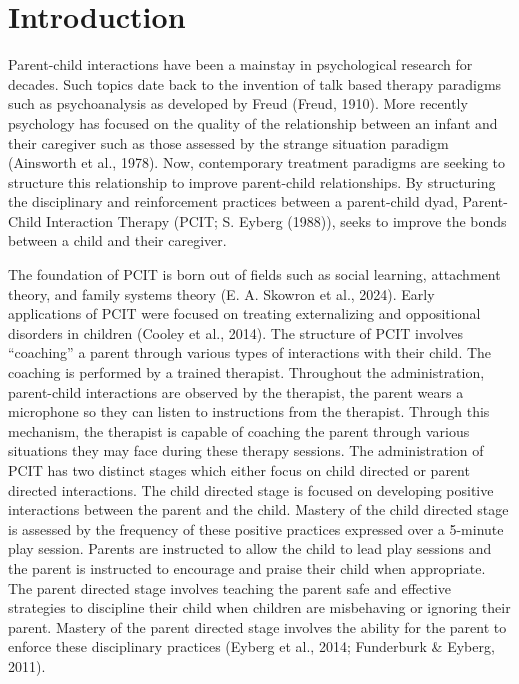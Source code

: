 \documentclass[12pt]{./styles/outhesis}
\begin{document}
\section{Introduction}
Parent-child interactions have been a mainstay in psychological research
for decades. Such topics date back to the invention of talk based
therapy paradigms such as psychoanalysis as developed by Freud (Freud,
1910). More recently psychology has focused on the quality of the
relationship between an infant and their caregiver such as those
assessed by the strange situation paradigm (Ainsworth et al., 1978).
Now, contemporary treatment paradigms are seeking to structure this
relationship to improve parent-child relationships. By structuring the
disciplinary and reinforcement practices between a parent-child dyad,
Parent-Child Interaction Therapy (PCIT; S. Eyberg (1988)), seeks to
improve the bonds between a child and their caregiver.

The foundation of PCIT is born out of fields such as social learning,
attachment theory, and family systems theory (E. A. Skowron et al.,
2024). Early applications of PCIT were focused on treating externalizing
and oppositional disorders in children (Cooley et al., 2014). The
structure of PCIT involves ``coaching'' a parent through various types
of interactions with their child. The coaching is performed by a trained
therapist. Throughout the administration, parent-child interactions are
observed by the therapist, the parent wears a microphone so they can
listen to instructions from the therapist. Through this mechanism, the
therapist is capable of coaching the parent through various situations
they may face during these therapy sessions. The administration of PCIT
has two distinct stages which either focus on child directed or parent
directed interactions. The child directed stage is focused on developing
positive interactions between the parent and the child. Mastery of the
child directed stage is assessed by the frequency of these positive
practices expressed over a 5-minute play session. Parents are instructed
to allow the child to lead play sessions and the parent is instructed to
encourage and praise their child when appropriate. The parent directed
stage involves teaching the parent safe and effective strategies to
discipline their child when children are misbehaving or ignoring their
parent. Mastery of the parent directed stage involves the ability for
the parent to enforce these disciplinary practices (Eyberg et al., 2014;
Funderburk \& Eyberg, 2011).
\end{document}
